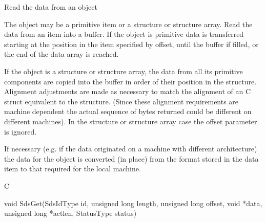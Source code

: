 \begin{manroutinedescription}
      Read the data from an object

      The object may be a primitive item or a structure or structure array.
      Read the data from an item into a buffer. If the object is primitive
      data is transferred starting at the position in the item specified by
      offset, until the buffer if filled, or the end of the data array is
      reached.

      If the object is a structure or structure array, the data from all its
      primitive components are copied into the buffer in order of their
      position in the structure. Alignment adjustments are made as necessary
      to match the alignment of an C struct equivalent to the {} %
structure.
      (Since these alignment requirements are machine dependent the actual
      sequence of bytes returned could be different on different machines).
      In the structure or structure array case the offset parameter is
      ignored.

      If necessary (e.g. if the data originated on a machine with different
      architecture) the data for the object is converted (in place) from the
      format stored in the data item to that required for the local machine.
 
      C

      void SdsGet(SdsIdType id, unsigned long length, unsigned long offset,
             void *data, unsigned long *actlen, StatusType {\mantt{*}} {} status)
 

\end{manroutinedescription}
